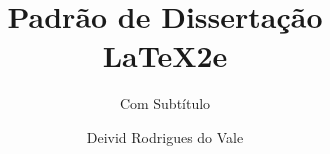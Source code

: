 \title{Padrão de Dissertação \texorpdfstring{\\ \LaTeX2e}{LaTeX2e}}

\subtitle{Com Subtítulo}

\author{Deivid Rodrigues do Vale}













\renewcommand{\submissiontext}{Dissertação apresentada como requisito parcial para obtenção do grau de}

